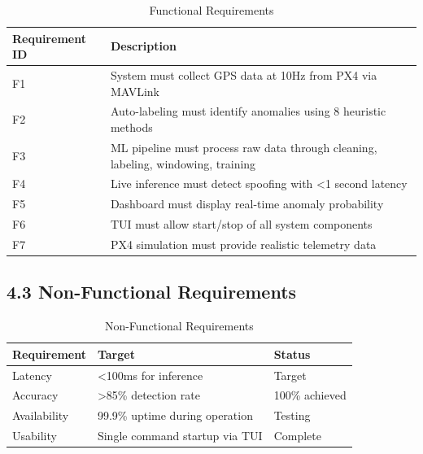 \begin{table}[htbp]
    \centering
    \caption{Functional Requirements}
    \label{tab:func_req}
    \begin{tabular}{|p{3cm}|p{12cm}|}
        \hline
        \textbf{Requirement ID} & \textbf{Description} \\
        \hline
        F1 & System must collect GPS data at 10Hz from PX4 via MAVLink \\
        \hline
        F2 & Auto-labeling must identify anomalies using 8 heuristic methods \\
        \hline
        F3 & ML pipeline must process raw data through cleaning, labeling, windowing, training \\
        \hline
        F4 & Live inference must detect spoofing with <1 second latency \\
        \hline
        F5 & Dashboard must display real-time anomaly probability \\
        \hline
        F6 & TUI must allow start/stop of all system components \\
        \hline
        F7 & PX4 simulation must provide realistic telemetry data \\
        \hline
    \end{tabular}
\end{table}

\subsection{4.3 Non-Functional Requirements}

\begin{table}[htbp]
    \centering
    \caption{Non-Functional Requirements}
    \label{tab:nonfunc_req}
    \begin{tabular}{|p{4cm}|p{5cm}|p{6cm}|}
        \hline
        \textbf{Requirement} & \textbf{Target} & \textbf{Status} \\
        \hline
        Latency & <100ms for inference & Target \\
        \hline
        Accuracy & >85\% detection rate & 100\% achieved \\
        \hline
        Availability & 99.9\% uptime during operation & Testing \\
        \hline
        Usability & Single command startup via TUI & Complete \\
        \hline
    \end{tabular}
\end{table}

